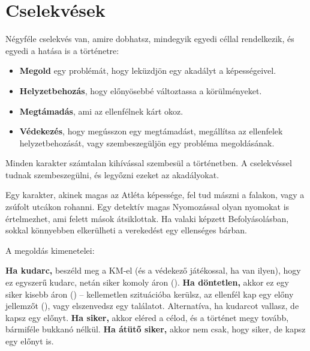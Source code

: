 \section{Cselekvések}

Négyféle cselekvés van, amire dobhatsz, mindegyik egyedi céllal rendelkezik, és egyedi a hatása is a történetre:

\begin{itemize}
    \item \textbf{Megold} egy problémát, hogy leküzdjön egy akadályt a képességeivel.
    \item \textbf{Helyzetbehozás}, hogy előnyösebbé változtassa a körülményeket.
    \item \textbf{Megtámadás}, ami az ellenfélnek kárt okoz.
    \item \textbf{Védekezés}, hogy megússzon egy megtámadást, megállítsa az ellenfelek helyzetbehozását, vagy szembeszegüljön egy probléma megoldásának.
\end{itemize}


Minden karakter számtalan kihívással szembesül a történetben. A  cselekvéssel tudnak szembeszegülni, és legyőzni ezeket az akadályokat.

Egy karakter, akinek magas az Atléta képessége, fel tud mászni a falakon, vagy a zsúfolt utcákon rohanni. Egy detektív magas Nyomozással olyan nyomokat is értelmezhet, ami felett mások átsiklottak. Ha valaki képzett Befolyásolásban, sokkal könnyebben elkerülheti a verekedést egy ellenséges bárban.

A megoldás kimenetelei:

\begin{itemize}
    \failureitem \textbf{Ha kudarc,} beszéld meg a KM‑el (és a védekező játékossal, ha van ilyen), hogy ez egyszerű kudarc, netán siker komoly áron ().
    \tieitem \textbf{Ha döntetlen,} akkor ez egy siker kisebb áron () – kellemetlen szituációba kerülsz, az ellenfél kap egy előny jellemzőt (), vagy elszenvedsz egy találatot. Alternatíva, ha kudarcot vallasz, de kapsz egy előnyt.
    \successitem \textbf{Ha siker,} akkor eléred a célod, és a történet megy tovább, bármiféle bukkanó nélkül.
    \successwithstyleitem \textbf{Ha átütő siker,} akkor nem csak, hogy siker, de kapsz egy előnyt is.
\end{itemize}


